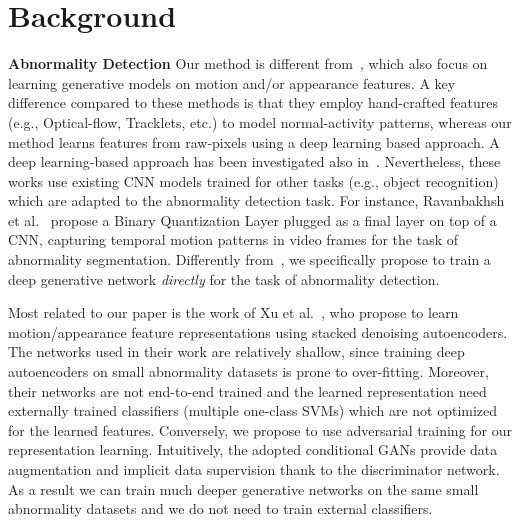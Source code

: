 \documentclass{article}
\begin{document}
	\section{Background}
	\label{sec:format}
	{\bf Abnormality Detection} Our method is different from~\cite{mehran2009abnormal,mousavi2015analyzing,Mahadevan.anomaly.2010,cong2011sparse,kim2009observe,raghavendra2013anomaly,rabiee2016novel,saligrama2012video,lu2013abnormal,mousavi2015abnormality,rabiee2016crowd,rabiee2017detection,huang2016crowd}, which also focus on learning generative models on motion and/or appearance features. A key difference compared to these methods is that they employ hand-crafted features (e.g., Optical-flow, Tracklets, etc.) to model normal-activity patterns, whereas our method learns features from raw-pixels using a deep learning based approach. A deep learning-based approach has been investigated also in~\cite{ravanbakhsh2016plug,sabokrouFFK16}. Nevertheless, these works use existing CNN models trained for other tasks (e.g., object recognition) which are adapted to the abnormality detection task. For instance, Ravanbakhsh et al.~\cite{ravanbakhsh2016plug} propose a Binary Quantization Layer plugged as a final layer on top of a CNN, capturing temporal motion patterns in video frames for the task of abnormality segmentation. Differently from~\cite{ravanbakhsh2016plug}, we specifically propose to train a deep generative network \emph{directly} for the task of abnormality detection. 

Most related to our paper is the work of Xu et al.~\cite{xu2015learning}, who propose to learn motion/appearance feature representations using stacked denoising autoencoders. The networks used in their work are relatively shallow, since training deep autoencoders on small abnormality datasets is prone to over-fitting. Moreover, their networks are not end-to-end trained and the learned representation need externally trained classifiers (multiple one-class SVMs) which are not optimized for the learned features. Conversely, we propose to use adversarial training for our representation learning. Intuitively, the adopted conditional GANs provide data augmentation and implicit data 
 supervision thank to the discriminator network. As a result we can train much deeper generative networks on the same small abnormality datasets and we do not need to train external classifiers.
	
\end{document}

